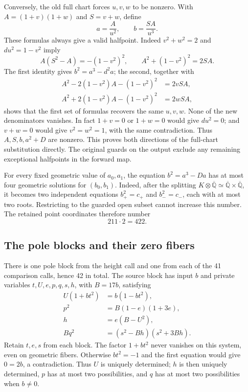 \documentclass[11pt]{article}
\theoremstyle{definition}
\begin{document}
Conversely, the old full chart forces $u,v,w$ to be nonzero.
With $A=(1+v)(1+w)$ and $S=v+w$, define
\[
 a=\frac{A}{u^2},\qquad b=\frac{SA}{u^3}.
\]
These formulas always give a valid halfpoint.  Indeed
$v^2+w^2=2$ and $du^2=1-v^2$ imply
\[
 A(S^2-A)=-(1-v^2)^2,\qquad
 A^2+(1-v^2)^2=2SA.
\]
The first identity gives $b^2=a^3-d^2a$; the second, together with
\begin{align*}
 A^2-2(1-v^2)A-(1-v^2)^2&=2vSA,\\
 A^2+2(1-v^2)A-(1-v^2)^2&=2wSA,
\end{align*}
shows that the first set of formulas recovers the same $u,v,w$.
None of the new denominators
vanishes.  In fact $1+v=0$ or $1+w=0$ would give $du^2=0$; and
$v+w=0$ would give $v^2=w^2=1$, with the same contradiction.
Thus $A,S,b,a^2+D$ are nonzero.  This proves both directions of the
full-chart substitution directly.  The original guards on the output
exclude any remaining exceptional halfpoints in the forward map.

For every fixed geometric value of $a_0,a_1$, the equation
$b^2=a^3-Da$ has at most four geometric solutions for $(b_0,b_1)$.
Indeed, after the splitting
$K\otimes\overline{\mathbb Q}\simeq
\overline{\mathbb Q}\times\overline{\mathbb Q}$, it becomes two
independent equations $b_+^2=c_+$ and $b_-^2=c_-$, each with at most
two roots.  Restricting to the guarded open subset cannot increase
this number.  The retained point coordinates therefore number
\[
 211\cdot2=422.
\]

\subsection{The pole blocks and their zero fibers}

There is one pole block from the height call and one from each of the
41 comparison calls, hence 42 in total.  The source block has input
$b$ and private variables $t,U,e,p,q,s,h$, with $B=17b$, satisfying
\begin{align*}
 U(1+bt^2)&=b(1-bt^2),\\
 p^2&=B(1-e)(1+3e),\\
 h&=e(B-U^2),\\
 Bq^2&=(s^2-Bh)(s^2+3Bh).
\end{align*}
Retain $t,e,s$ from each block.  The factor $1+bt^2$ never vanishes
on this system, even on geometric fibers.  Otherwise $bt^2=-1$ and
the first equation would give $0=2b$, a contradiction.  Thus $U$ is
uniquely determined; $h$ is then uniquely determined, $p$ has at most
two possibilities, and $q$ has at most two possibilities when $b\ne0$.
\end{document}

